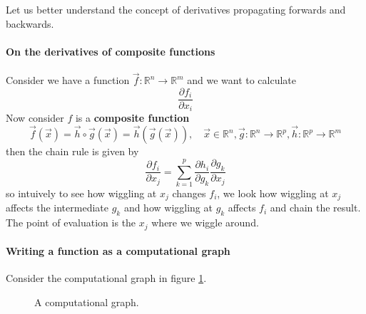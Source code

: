 

Let us better understand the concept of derivatives propagating
forwards and backwards.
\paragraph*{On the derivatives of composite functions} Consider we have a function
$\vec{f}: \mathbb{R}^n \rightarrow \mathbb{R}^m$ and we want to calculate
\begin{equation}
    \frac{\partial f_i}{\partial x_i}
\end{equation}
Now consider $f$ is a \textbf{composite function}
\begin{equation}
    \vec{f}(\vec{x}) = \vec{h} \circ \vec{g}(\vec{x}) = \vec{h}(\vec{g}(\vec{x})), \quad \vec{x} \in \mathbb{R}^n, \vec{g}: \mathbb{R}^n \rightarrow \mathbb{R}^p, \vec{h}: \mathbb{R}^p \rightarrow \mathbb{R}^m
\end{equation}
then the chain rule is given by
\begin{equation}
    \frac{\partial f_i}{\partial x_j} = \sum_{k=1}^{p} \frac{\partial h_i}{\partial g_k} \frac{\partial g_k}{\partial x_j}
\end{equation}
so intuively to see how wiggling at $x_j$ changes $f_i$, we look how wiggling at $x_j$ affects the
intermediate $g_k$ and how wiggling at $g_k$ affects $f_i$ and chain the result. The point of
evaluation is the $x_j$ where we wiggle around.

\paragraph*{Writing a function as a computational graph} 
Consider the computational graph in figure \ref{fig:comp_graph}.

\begin{figure}[!htb]
    \centering
    
    \caption{A computational graph.}
    \label{fig:comp_graph}
\end{figure}


